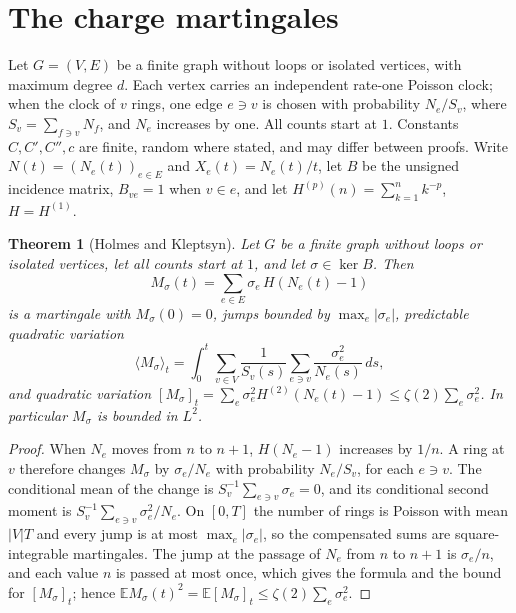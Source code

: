 \documentclass[11pt]{amsart}
\newtheorem{theorem}{Theorem}\newtheorem{lemma}[theorem]{Lemma}\newtheorem{proposition}[theorem]{Proposition}
\theoremstyle{remark}\newtheorem{remark}[theorem]{Remark}
\begin{document}
\section{The charge martingales}\label{sec:mart}
Let $G=(V,E)$ be a finite graph without loops or isolated vertices, with maximum degree $d$. Each vertex carries an
independent rate-one Poisson clock; when the clock of $v$ rings, one edge $e\ni v$ is chosen with probability $N_e/S_v$,
where $S_v=\sum_{f\ni v}N_f$, and $N_e$ increases by one. All counts start at $1$. Constants $C,C',C'',c$ are finite,
random where stated, and may differ between proofs. Write $N(t)=(N_e(t))_{e\in E}$ and $X_e(t)=N_e(t)/t$, let $B$ be
the unsigned incidence matrix, $B_{ve}=1$ when $v\in e$, and let $H^{(p)}(n)=\sum_{k=1}^nk^{-p}$, $H=H^{(1)}$.

\begin{theorem}[Holmes and Kleptsyn]\label{thm:mart}
Let $G$ be a finite graph without loops or isolated vertices, let all counts start at $1$, and let $\sigma\in\ker B$. Then
\[ M_\sigma(t)=\sum_{e\in E}\sigma_e\,H(N_e(t)-1) \]
is a martingale with $M_\sigma(0)=0$, jumps bounded by $\max_e|\sigma_e|$, predictable quadratic variation
\[ \langle M_\sigma\rangle_t=\int_0^t\sum_{v\in V}\frac{1}{S_v(s)}\sum_{e\ni v}\frac{\sigma_e^2}{N_e(s)}\,ds , \]
and quadratic variation $[M_\sigma]_t=\sum_e\sigma_e^2H^{(2)}(N_e(t)-1)\le\zeta(2)\sum_e\sigma_e^2$. In particular
$M_\sigma$ is bounded in $L^2$.
\end{theorem}
\begin{proof}
When $N_e$ moves from $n$ to $n+1$, $H(N_e-1)$ increases by $1/n$. A ring at $v$ therefore changes $M_\sigma$ by
$\sigma_e/N_e$ with probability $N_e/S_v$, for each $e\ni v$. The conditional mean of the change is
$S_v^{-1}\sum_{e\ni v}\sigma_e=0$, and its conditional second moment is $S_v^{-1}\sum_{e\ni v}\sigma_e^2/N_e$. On $[0,T]$
the number of rings is Poisson with mean $|V|T$ and every jump is at most $\max_e|\sigma_e|$, so the compensated sums are
square-integrable martingales. The jump at the passage of $N_e$ from $n$ to $n+1$ is $\sigma_e/n$, and each value $n$ is
passed at most once, which gives the formula and the bound for $[M_\sigma]_t$; hence
$\mathbb{E}M_\sigma(t)^2=\mathbb{E}[M_\sigma]_t\le\zeta(2)\sum_e\sigma_e^2$.
\end{proof}
\end{document}
